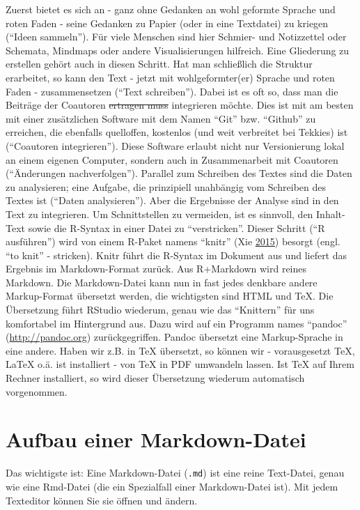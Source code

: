 \documentclass[12pt,]{book}
\begin{document}
Zuerst bietet es sich an - ganz ohne Gedanken an wohl geformte Sprache
und roten Faden - seine Gedanken zu Papier (oder in eine Textdatei) zu
kriegen (``Ideen sammeln''). Für viele Menschen sind hier Schmier- und
Notizzettel oder Schemata, Mindmaps oder andere Visualisierungen
hilfreich. Eine Gliederung zu erstellen gehört auch in diesen Schritt.
Hat man schließlich die Struktur erarbeitet, so kann den Text - jetzt
mit wohlgeformter(er) Sprache und roten Faden - zusammensetzen (``Text
schreiben''). Dabei ist es oft so, dass man die Beiträge der Coautoren
\sout{ertragen muss} integrieren möchte. Dies ist mit am besten mit
einer zusätzlichen Software mit dem Namen ``Git'' bzw. ``Github'' zu
erreichen, die ebenfalls quelloffen, kostenlos (und weit verbreitet bei
Tekkies) ist (``Coautoren integrieren''). Diese Software erlaubt nicht
nur Versionierung lokal an einem eigenen Computer, sondern auch in
Zusammenarbeit mit Coautoren (``Änderungen nachverfolgen''). Parallel
zum Schreiben des Textes sind die Daten zu analysieren; eine Aufgabe,
die prinzipiell unahbängig vom Schreiben des Textes ist (``Daten
analysieren''). Aber die Ergebnisse der Analyse sind in den Text zu
integrieren. Um Schnittstellen zu vermeiden, ist es sinnvoll, den
Inhalt-Text sowie die R-Syntax in einer Datei zu ``verstricken''. Dieser
Schritt (``R ausführen'') wird von einem R-Paket namens ``knitr'' (Xie
\protect\hyperlink{ref-xie2015}{2015}) besorgt (engl. ``to knit'' -
stricken). Knitr führt die R-Syntax im Dokument aus und liefert das
Ergebnis im Markdown-Format zurück. Aus R+Markdown wird reines Markdown.
Die Markdown-Datei kann nun in fast jedes denkbare andere Markup-Format
übersetzt werden, die wichtigsten sind HTML und TeX. Die Übersetzung
führt RStudio wiederum, genau wie das ``Knittern'' für uns komfortabel
im Hintergrund aus. Dazu wird auf ein Programm names ``pandoc''
(\url{http://pandoc.org}) zurückgegriffen. Pandoc übersetzt eine
Markup-Sprache in eine andere. Haben wir z.B. in TeX übersetzt, so
können wir - vorausgesetzt TeX, LaTeX o.ä. ist installiert - von TeX in
PDF umwandeln lassen. Ist TeX auf Ihrem Rechner installiert, so wird
dieser Übersetzung wiederum automatisch vorgenommen.

\section{Aufbau einer Markdown-Datei}\label{aufbau-einer-markdown-datei}

Das wichtigste ist: Eine Markdown-Datei (\texttt{.md}) ist eine reine
Text-Datei, genau wie eine Rmd-Datei (die ein Spezialfall einer
Markdown-Datei ist). Mit jedem Texteditor können Sie sie öffnen und
ändern.
\end{document}
